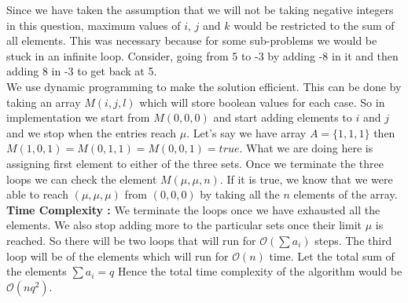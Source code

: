 \documentclass[14pt]{article}
\begin{document}
		Since we have taken the assumption that we will not be taking negative integers in this question, maximum values of $i$, $j$ and $k$ would be restricted to the sum of all elements. This was necessary because for some sub-problems we would be stuck in an infinite loop. Consider, going from 5 to -3 by adding -8 in it and then adding 8 in -3 to get back at 5. \\
		\newline
		We use dynamic programming to make the solution efficient. This can be done by taking an array $M(i, j, l)$ which will store boolean values for each case. So in implementation we start from $M(0, 0, 0)$ and start adding elements to $i$ and $j$ and we stop when the entries reach $\mu$. Let's say we have array $A = \{1, 1, 1\}$ then $M(1, 0, 1) = M(0, 1, 1) = M(0, 0, 1) = true$. What we are doing here is assigning first element to either of the three sets. Once we terminate the three loops we can check the element $M(\mu, \mu, n)$. If it is true, we know that we were able to reach $(\mu, \mu, \mu)$ from $(0, 0, 0)$ by taking all the $n$ elements of the array.\\
		\newline
		\textbf{Time Complexity : }We terminate the loops once we have exhausted all the elements. We also stop adding more to the particular sets once their limit $\mu$ is reached. So there will be two loops that will run for $\mathcal{O}(\sum a_i)$ steps. The third loop will be of the elements which will run for $\mathcal{O}(n)$ time. Let the total sum of the elements $\sum a_i = q$ Hence the total time complexity of the algorithm would be $\mathcal{O}(nq^2)$. 
\end{document}
